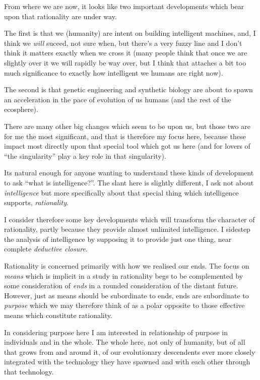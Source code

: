 From where we are now, it looks like two important developments which bear upon
that rationality are under way.

The first is that we (humanity) are intent on building intelligent machines, and,
I think we {\it will} suceed, not sure when, but there's a very fuzzy line and
I don't think it matters exactly when we cross it (many people think that once
we are slightly over it we will rapidly be way over, but I think that attaches
a bit too much significance to exactly how intelligent we humans are right now). 

The second is that genetic engineering and synthetic biology are about to
spawn an acceleration in the pace of evolution of us humans (and the rest of
the ecosphere).

There are many other big changes which seem to be upon us, but those two are
for me the most significant, and that is therefore my focus here, because these
impact most directly upon that special tool which got us here (and for lovers
of ``the singularity'' play a key role in that singularity).

Its natural enough for anyone wanting to understand these kinds of development to ask ``what is intelligence?''.
The slant here is slightly different, I ask not about {\it intelligence} but more specifically
about that special thing which intelligence supports, {\it rationality}.

I consider therefore some key developments which will transform the character of rationality,
partly because they provide almost unlimited intelligence.
I sidestep the analysis of intelligence by supposing it to provide just one thing,
near complete {\it deductive closure}.

Rationality is concerned primarily with how we realised our ends.
The focus on {\it means} which is implicit in a study in rationality begs to be complemented
by some consideration of {\it ends} in a rounded consideration of the distant future.
However, just as means should be subordinate to ends, ends are subordinate to {\it purpose}
which we may therefore think of as a polar opposite to those effective means which constitute
rationality.

In considering purpose here I am interested in relationship of purpose in individuals and in
the whole.
The whole here, not only of humanity, but of all that grows from and around it, of our evolutionary
descendents ever more closely integrated with the technology they have spawned and with each
other through that technology.


